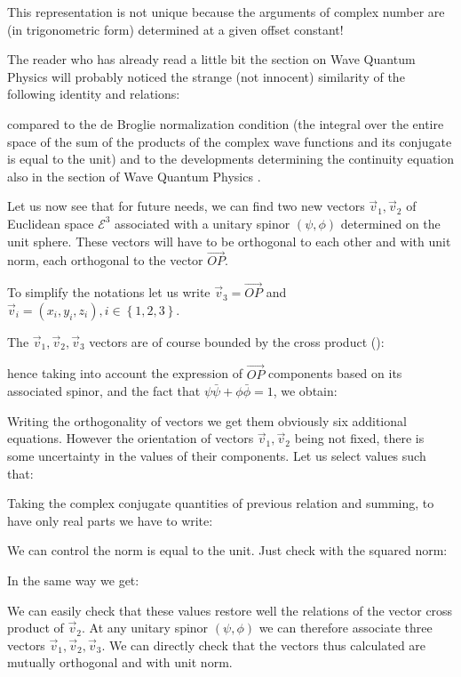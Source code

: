 	\begin{tcolorbox}[title=Remark,colframe=black,arc=10pt]
This representation is not unique because the arguments of complex number are (in trigonometric form) determined at a given offset constant!
	\end{tcolorbox}	
	
	The reader who has already read a little bit the section on Wave Quantum Physics  will probably noticed the strange (not innocent) similarity of the following identity and relations:
	
	compared to the de Broglie normalization condition (the integral over the entire space of the sum of the products of the complex wave functions and its conjugate is equal to the unit) and to the developments determining the continuity equation also in the section of Wave Quantum Physics .
	
	Let us now see that for future needs, we can find two new vectors $\vec{v}_1,\vec{v}_2$ of Euclidean space $\mathcal{E}^3$ associated with a unitary spinor $(\psi,\phi) $ determined on the unit sphere. These vectors will have to be orthogonal to each other and with unit norm, each orthogonal to the vector $\overrightarrow{OP}$.	
	
	To simplify the notations let us write  $\vec{v}_3=\overrightarrow{OP}$ and $\vec{v}_i=(x_i,y_i,z_i),i\in \left\lbrace 1, 2 ,3\right\rbrace$.
	
	The $\vec{v}_1,\vec{v}_2,\vec{v}_3$ vectors are of course bounded by the cross product ():
	
	hence taking into account the expression of $\overrightarrow{OP}$ components based on its associated spinor, and the fact that $\psi\bar{\psi}+\phi\bar{\phi}=1$, we obtain:
	
	Writing the orthogonality of vectors we get them obviously six additional equations. However the orientation of vectors $\vec{v}_1,\vec{v}_2$ being not fixed, there is some uncertainty in the values of their components. Let us select values such that:
	
	Taking the complex conjugate quantities of previous relation and summing, to have only real parts we have to write:
	
	We can control the norm is equal to the unit. Just check with the squared norm:
	
	In the same way we get:
	
	We can easily check that these values restore well the relations of the vector cross product of $\vec{v}_2$. At any unitary spinor $(\psi,\phi)$ we can therefore associate three vectors $\vec{v}_1,\vec{v}_2,\vec{v}_3$. We can directly check that the vectors thus calculated are mutually orthogonal and with unit norm.
	
